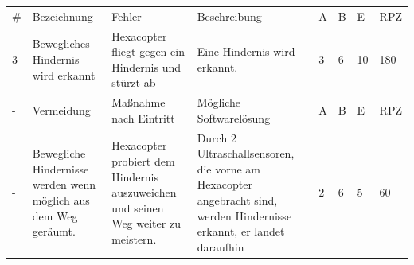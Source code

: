 \begin{longtable}{|p{0.4cm}|p{3.0cm}|p{3.1cm}|p{3.1cm}|p{0.4cm}|p{0.4cm}|p{0.4cm}|p{0.8cm}|}
\hline \#   & Bezeichnung                                                                                               & Fehler                                                                                                                & Beschreibung                                                                                                                    & A   & B   & E   & RPZ \\
 3          & Bewegliches Hindernis wird erkannt                                                                        & Hexacopter fliegt gegen ein Hindernis und stürzt ab                                                                   & Eine Hindernis wird erkannt.                                                                                                    & 3   & 6   & 10  & 180 \\
\hline -    & Vermeidung                                                                                                & Maßnahme nach Eintritt                                                                                                & Mögliche Softwarelösung                                                                                                         & A   & B   & E   & RPZ \\
 -          & Bewegliche Hindernisse werden wenn möglich aus dem Weg geräumt.                                           & Hexacopter probiert dem Hindernis auszuweichen und seinen Weg weiter zu meistern.                                     & Durch 2 Ultraschallsensoren, die vorne am Hexacopter angebracht sind, werden Hindernisse erkannt, er landet daraufhin           & 2   & 6   & 5   & 60  \\\hline


\end{longtable}
